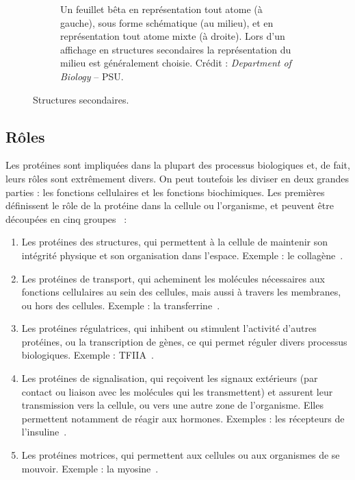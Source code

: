 \begin{appendices}
\begin{figure}[!htbp]
\begin{subfigure}[b]{.49\textwidth}
			\caption[Feuillets bêta]{Un feuillet bêta en représentation \og tout atome \fg{} (à gauche), sous forme schématique (au milieu), et en représentation \og tout atome \fg{} mixte (à droite). Lors d'un affichage \og en structures secondaires \fg{} la représentation du milieu est généralement choisie. Crédit : \emph{Department of Biology} -- PSU\footnotemark.}
			\label{fig:bSheet}
		\end{subfigure}
		\caption{Structures secondaires.}
		\label{fig:secStructs}
	\end{figure}
	
	\addtocounter{footnote}{-1}
	\addtocounter{footnote}{1}
	
	\subsection{Rôles}
	Les protéines sont impliquées dans la plupart des processus biologiques et, de fait, leurs rôles sont extrêmement divers. On peut toutefois les diviser en deux grandes parties : les fonctions cellulaires et les fonctions biochimiques. Les premières définissent le rôle de la protéine dans la cellule ou l'organisme, et peuvent être découpées en cinq groupes~\cite{lodish1995molecular} :
	\begin{enumerate}
		\item Les protéines des structures, qui permettent à la cellule de maintenir son intégrité physique et son organisation dans l'espace. Exemple : le collagène~\cite{di2002mapping}.
		\item Les protéines de transport, qui acheminent les molécules nécessaires aux fonctions cellulaires au sein des cellules, mais aussi à travers les membranes, ou hors des cellules. Exemple : la transferrine~\cite{crichton1987iron}. 
		\item Les protéines régulatrices, qui inhibent ou stimulent l'activité d'autres protéines, ou la transcription de gènes, ce qui permet réguler divers processus biologiques. Exemple : TFIIA~\cite{tan1996crystal}.
		\item Les protéines de signalisation, qui reçoivent les signaux extérieurs (par contact ou liaison avec les molécules qui les transmettent) et assurent leur transmission vers la cellule, ou vers une autre zone de l'organisme. Elles permettent notamment de réagir aux hormones. Exemples : les récepteurs de l'insuline~\cite{gammeltoft1984insulin}.
		\item Les protéines motrices, qui permettent aux cellules ou aux organismes de se mouvoir. Exemple : la myosine~\cite{pollard1973acanthamoeba}.
	\end{enumerate}
	

\end{appendices}
